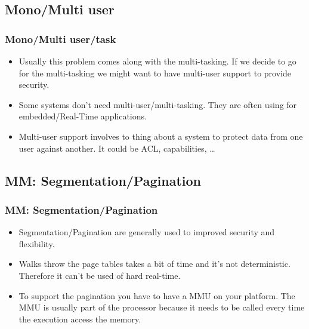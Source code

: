 \subsection{Mono/Multi user}
\begin{frame}
  \frametitle{Mono/Multi user/task}
  \begin{itemize}
        \item Usually this problem comes along with the multi-tasking.
        If we decide to go for the multi-tasking we might want to have multi-user support to provide security.
        \item Some systems don't need multi-user/multi-tasking. They are often using for embedded/Real-Time applications.
        \item Multi-user support involves to thing about a system to protect data from one user against another. It could be ACL, capabilities, \ldots
  \end{itemize}
\end{frame}


\subsection{MM: Segmentation/Pagination}
\begin{frame}
  \frametitle{MM: Segmentation/Pagination}
  \begin{itemize}
        \item Segmentation/Pagination are generally used to improved
        security and flexibility.
        \item Walks throw the page tables takes a bit of time and
        it's not deterministic. Therefore it can't be used of hard
        real-time.
        \item To support the pagination you have to have a MMU on your
        platform. The MMU is usually part of the processor because it
        needs to be called every time the execution access the memory.
  \end{itemize}
\end{frame}

